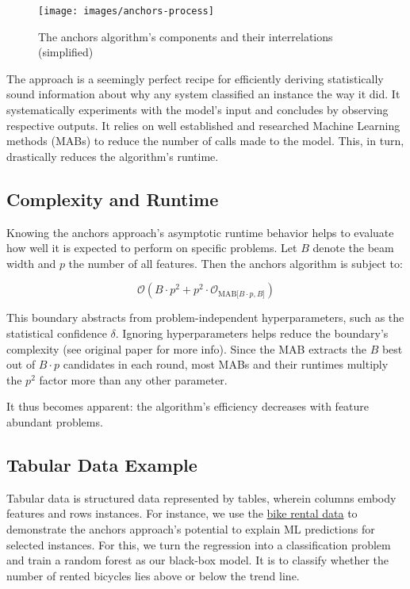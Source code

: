 \documentclass[12pt,]{krantz}
\begin{document}
\begin{figure}

{\centering \texttt{[image: images/anchors-process]} 

}

\caption{The anchors algorithm’s components and their interrelations (simplified)}\label{fig:unnamed-chunk-30}
\end{figure}

The approach is a seemingly perfect recipe for efficiently deriving
statistically sound information about why any system classified an
instance the way it did. It systematically experiments with the model's
input and concludes by observing respective outputs. It relies on well
established and researched Machine Learning methods (MABs) to reduce the
number of calls made to the model. This, in turn, drastically reduces
the algorithm's runtime.

\subsection{Complexity and Runtime}\label{complexity-and-runtime}

Knowing the anchors approach's asymptotic runtime behavior helps to
evaluate how well it is expected to perform on specific problems. Let
\(B\) denote the beam width and \(p\) the number of all features. Then
the anchors algorithm is subject to:

\[\mathcal{O}(B\cdot{}p^2+p^2\cdot\mathcal{O}_{\textrm{MAB}\lbrack{}B\cdot{}p,B\rbrack})\]

This boundary abstracts from problem-independent hyperparameters, such
as the statistical confidence \(\delta\). Ignoring hyperparameters helps
reduce the boundary's complexity (see original paper for more info).
Since the MAB extracts the \(B\) best out of \(B \cdot p\) candidates in
each round, most MABs and their runtimes multiply the \(p^2\) factor
more than any other parameter.

It thus becomes apparent: the algorithm's efficiency decreases with
feature abundant problems.

\subsection{Tabular Data Example}\label{tabular-data-example}

Tabular data is structured data represented by tables, wherein columns
embody features and rows instances. For instance, we use the
\protect\hyperlink{bike-data}{bike rental data} to demonstrate the
anchors approach's potential to explain ML predictions for selected
instances. For this, we turn the regression into a classification
problem and train a random forest as our black-box model. It is to
classify whether the number of rented bicycles lies above or below the
trend line.
\end{document}
